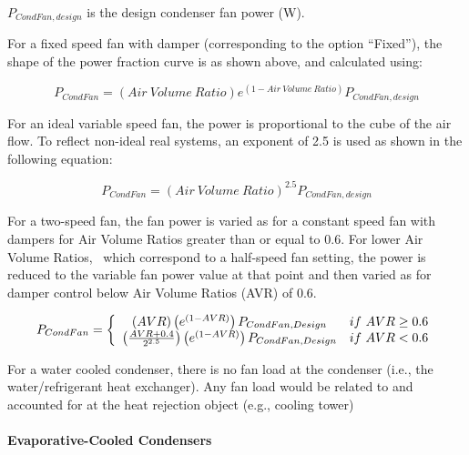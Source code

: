\({P_{CondFan,design}}\) is the design condenser fan power (W).

For a fixed speed fan with damper (corresponding to the option ``Fixed''), the shape of the power fraction curve is as shown above, and calculated using:

\begin{equation}
{P_{CondFan}} = ({Air~Volume~Ratio}){e^{(1 - {Air~Volume~Ratio})}}{P_{CondFan,design}}
\end{equation}

For an ideal variable speed fan, the power is proportional to the cube of the air flow. To reflect non-ideal real systems, an exponent of 2.5 is used as shown in the following equation:

\begin{equation}
{P_{CondFan}} = {({Air~Volume~Ratio})^{2.5}}{P_{CondFan,design}}
\end{equation}

For a two-speed fan, the fan power is varied as for a constant speed fan with dampers for Air Volume Ratios greater than or equal to 0.6. For lower Air Volume Ratios,~ which correspond to a half-speed fan setting, the power is reduced to the variable fan power value at that point and then varied as for damper control below Air Volume Ratios (AVR) of 0.6.

\begin{equation}
  P_{CondFan} = \left\{ \begin{array}{cr}
                          \left(AVR\right)\left(e^{\left(1-AVR\right)}\right)P_{CondFan,Design} & if~AVR \geq 0.6 \\
                          \left(\frac{AVR+0.4}{2^{2.5}}\right)\left(e^{\left(1-AVR\right)}\right)P_{CondFan,Design} & if~AVR < 0.6
                        \end{array}
                \right.
\end{equation}

For a water cooled condenser, there is no fan load at the condenser (i.e., the~ water/refrigerant heat exchanger). Any fan load would be related to and accounted for at the heat rejection object (e.g., cooling tower)

\paragraph{Evaporative-Cooled Condensers}\label{evaporative-cooled-condensers}

